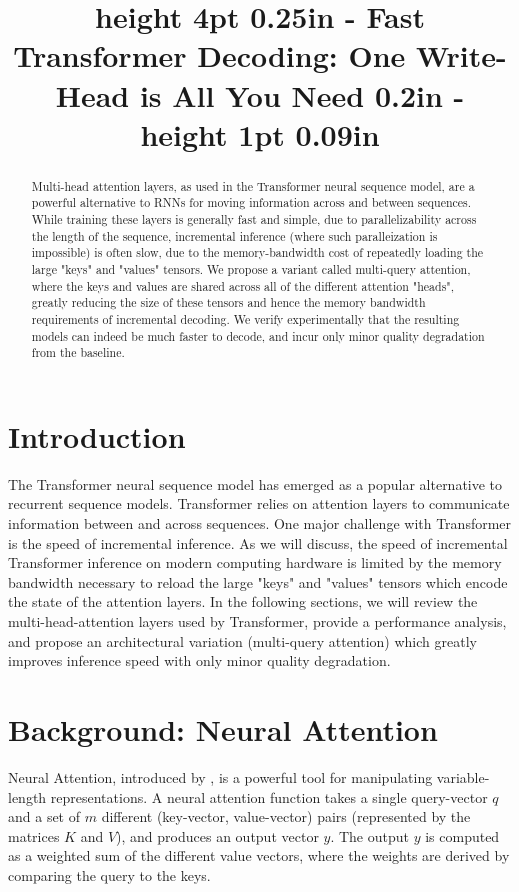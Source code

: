 \title{height 4pt 0.25in - Fast Transformer Decoding: One Write-Head is All You Need 0.2in - height 1pt 0.09in}

\begin{abstract}
Multi-head attention layers, as used in the Transformer neural sequence model, are a powerful alternative to RNNs for moving information across and between sequences.  While training these layers is generally fast and simple, due to parallelizability across the length of the sequence, incremental inference (where such paralleization is impossible) is often slow, due to the memory-bandwidth cost of repeatedly loading the large "keys" and "values" tensors. We propose a variant called multi-query attention, where the keys and values are shared across all of the different attention "heads", greatly reducing the size of these tensors and hence the memory bandwidth requirements of incremental decoding.  We verify experimentally that the resulting models can indeed be much faster to decode, and incur only minor quality degradation from the baseline.
\end{abstract}

\section{Introduction}
The Transformer neural sequence model \citep{Vas17} has emerged as a popular alternative to recurrent sequence models.  Transformer relies on attention layers to communicate information between and across sequences.  One major challenge with Transformer is the speed of incremental inference.  As we will discuss, the speed of incremental Transformer inference on modern computing hardware is limited by the memory bandwidth necessary to reload the large "keys" and "values" tensors which encode the state of the attention layers.  In the following sections, we will review the multi-head-attention layers used by Transformer, provide a performance analysis, and propose an architectural variation (multi-query attention) which greatly improves inference speed with only minor quality degradation.

\section{Background: Neural Attention}

Neural Attention, introduced by \citep{1409.0473}, is a powerful tool for manipulating variable-length representations.  A neural attention function takes a single query-vector $q$ and a set of $m$ different (key-vector, value-vector) pairs (represented by the matrices $K$ and $V$), and produces an output vector $y$.  The output $y$ is computed as a weighted sum of the different value vectors, where the weights are derived by comparing the query to the keys.

